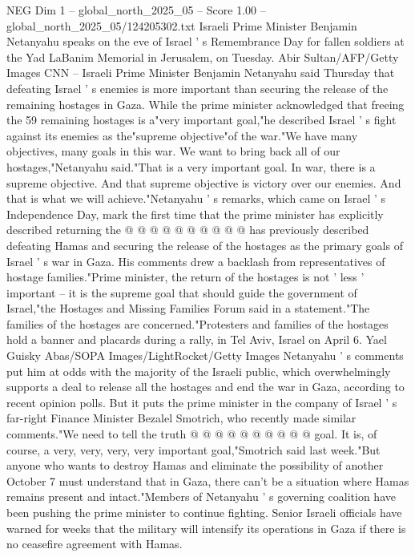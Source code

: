 \begin{textsample}{NEG Dim 1 – global\_north\_2025\_05 – Score 1.00 – global\_north\_2025\_05/124205302.txt}  \label{ex:f1_neg_077}
Israeli Prime Minister Benjamin Netanyahu speaks on the eve of Israel ' s Remembrance Day for fallen soldiers at the Yad LaBanim Memorial in Jerusalem, on Tuesday.
Abir Sultan/AFP/Getty Images CNN -- Israeli Prime Minister Benjamin Netanyahu said Thursday that defeating Israel ' s enemies is more important than securing the release of the remaining hostages in Gaza.
While the prime minister acknowledged that freeing the 59 remaining hostages is a"very important goal,"he described Israel ' s fight against its enemies as the"supreme objective"of the war."We have many objectives, many goals in this war.
We want to bring back all of our hostages,"Netanyahu said."That is a very important goal.
In war, there is a supreme objective.
And that supreme objective is victory over our enemies.
And that is what we will achieve."Netanyahu ' s remarks, which came on Israel ' s Independence Day, mark the first time that the prime minister has explicitly described returning the @ @ @ @ @ @ @ @ @ @ has previously described defeating Hamas and securing the release of the hostages as the primary goals of Israel ' s war in Gaza.
His comments drew a backlash from representatives of hostage families."Prime minister, the return of the hostages is not ' less ' important -- it is the supreme goal that should guide the government of Israel,"the Hostages and Missing Families Forum said in a statement."The families of the hostages are concerned."Protesters and families of the hostages hold a banner and placards during a rally, in Tel Aviv, Israel on April 6.
Yael Guisky Abas/SOPA Images/LightRocket/Getty Images Netanyahu ' s comments put him at odds with the majority of the Israeli public, which overwhelmingly supports a deal to release all the hostages and end the war in Gaza, according to recent opinion polls.
But it puts the prime minister in the company of Israel ' s far-right Finance Minister Bezalel Smotrich, who recently made similar comments."We need to tell the truth @ @ @ @ @ @ @ @ @ @ goal.
It is, of course, a very, very, very, very important goal,"Smotrich said last week."But anyone who wants to destroy Hamas and eliminate the possibility of another October 7 must understand that in Gaza, there can't be a situation where Hamas remains present and intact."Members of Netanyahu ' s governing coalition have been pushing the prime minister to continue fighting.
Senior Israeli officials have warned for weeks that the military will intensify its operations in Gaza if there is no ceasefire agreement with Hamas.

\end{textsample}

